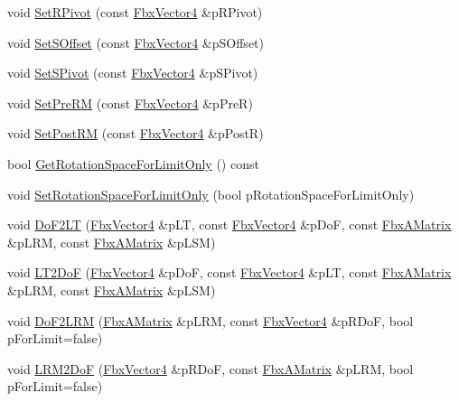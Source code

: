\begin{DoxyCompactItemize}
\item 
void \hyperlink{class_fbx_transform_a0c4646271d2b4205288c6dc2200fc57b}{Set\+R\+Pivot} (const \hyperlink{class_fbx_vector4}{Fbx\+Vector4} \&p\+R\+Pivot)
\item 
void \hyperlink{class_fbx_transform_a62c43ef5f9f11e06b88649ed0dd3b4b5}{Set\+S\+Offset} (const \hyperlink{class_fbx_vector4}{Fbx\+Vector4} \&p\+S\+Offset)
\item 
void \hyperlink{class_fbx_transform_a7a7084f9afd2f102f8db147e4b1c1583}{Set\+S\+Pivot} (const \hyperlink{class_fbx_vector4}{Fbx\+Vector4} \&p\+S\+Pivot)
\item 
void \hyperlink{class_fbx_transform_af0c78d72502a10185b169a3d2e338923}{Set\+Pre\+RM} (const \hyperlink{class_fbx_vector4}{Fbx\+Vector4} \&p\+PreR)
\item 
void \hyperlink{class_fbx_transform_aa2083d4610e0f3dac32ac07f1b0b67f3}{Set\+Post\+RM} (const \hyperlink{class_fbx_vector4}{Fbx\+Vector4} \&p\+PostR)
\item 
bool \hyperlink{class_fbx_transform_ac84253f0b36bbcbecff02da35d69e474}{Get\+Rotation\+Space\+For\+Limit\+Only} () const
\item 
void \hyperlink{class_fbx_transform_a36e9405be837036637bf321b31b7b062}{Set\+Rotation\+Space\+For\+Limit\+Only} (bool p\+Rotation\+Space\+For\+Limit\+Only)
\item 
void \hyperlink{class_fbx_transform_a37e9fe96d732d9231d8512529db452b0}{Do\+F2\+LT} (\hyperlink{class_fbx_vector4}{Fbx\+Vector4} \&p\+LT, const \hyperlink{class_fbx_vector4}{Fbx\+Vector4} \&p\+DoF, const \hyperlink{class_fbx_a_matrix}{Fbx\+A\+Matrix} \&p\+L\+RM, const \hyperlink{class_fbx_a_matrix}{Fbx\+A\+Matrix} \&p\+L\+SM)
\item 
void \hyperlink{class_fbx_transform_ae650285f1c785fc88abd2937e6dd1882}{L\+T2\+DoF} (\hyperlink{class_fbx_vector4}{Fbx\+Vector4} \&p\+DoF, const \hyperlink{class_fbx_vector4}{Fbx\+Vector4} \&p\+LT, const \hyperlink{class_fbx_a_matrix}{Fbx\+A\+Matrix} \&p\+L\+RM, const \hyperlink{class_fbx_a_matrix}{Fbx\+A\+Matrix} \&p\+L\+SM)
\item 
void \hyperlink{class_fbx_transform_a847bede94ccc4f6376c25e9b891472e4}{Do\+F2\+L\+RM} (\hyperlink{class_fbx_a_matrix}{Fbx\+A\+Matrix} \&p\+L\+RM, const \hyperlink{class_fbx_vector4}{Fbx\+Vector4} \&p\+R\+DoF, bool p\+For\+Limit=false)
\item 
void \hyperlink{class_fbx_transform_abce0f74a057f18e9f28b605249f15f44}{L\+R\+M2\+DoF} (\hyperlink{class_fbx_vector4}{Fbx\+Vector4} \&p\+R\+DoF, const \hyperlink{class_fbx_a_matrix}{Fbx\+A\+Matrix} \&p\+L\+RM, bool p\+For\+Limit=false)

\end{DoxyCompactItemize}
